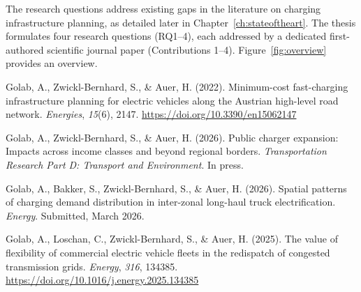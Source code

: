    The research questions address existing gaps in the literature on charging infrastructure planning, as detailed later in Chapter~\ref{ch:stateoftheart}. The thesis formulates four research questions (RQ1--4), each addressed by a dedicated first-authored scientific journal paper (Contributions 1--4). Figure~\ref{fig:overview} provides an overview.
    \begin{description}[leftmargin=2.5cm, labelwidth=2.3cm, labelsep=0.2cm, style=nextline]
        \item[\textbf{Contribution 1}] Golab, A., Zwickl-Bernhard, S., \& Auer, H. (2022). Minimum-cost fast-charging infrastructure planning for electric vehicles along the Austrian high-level road network. \textit{Energies}, \textit{15}(6), 2147. \href{https://doi.org/10.3390/en15062147}{https://doi.org/10.3390/en15062147} \cite{en15062147}
        \item[\textbf{Contribution 2}] Golab, A., Zwickl-Bernhard, S., \& Auer, H. (2026). Public charger expansion: Impacts across income classes and beyond regional borders. \textit{Transportation Research Part D: Transport and Environment}. In press. \cite{GOLAB2026PublicCharger}
        \item[\textbf{Contribution 3}] Golab, A., Bakker, S., Zwickl-Bernhard, S., \& Auer, H. (2026). Spatial patterns of charging demand distribution in inter-zonal long-haul truck electrification. \textit{Energy}. Submitted, March 2026. \cite{GOLAB2026SpatialTruck}
        \item[\textbf{Contribution 4}] Golab, A., Loschan, C., Zwickl-Bernhard, S., \& Auer, H. (2025). The value of flexibility of commercial electric vehicle fleets in the redispatch of congested transmission grids. \textit{Energy}, \textit{316}, 134385. \href{https://doi.org/10.1016/j.energy.2025.134385}{https://doi.org/10.1016/j.energy.2025.134385} \cite{GOLAB2025134385}
    \end{description}

